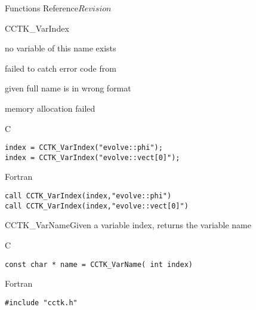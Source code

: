 \begin{cactuspart}{ Functions Reference}{}{$Revision$}
\begin{FunctionDescription}{CCTK\_VarIndex}{}
\begin{ErrorSection}
\begin{Error}{-1}
no variable of this name exists
\end{Error}
\begin{Error}{-2}
failed to catch error code from 
\end{Error}
\begin{Error}{-3}
given full name is in wrong format
\end{Error}
\begin{Error}{-4}
memory allocation failed
\end{Error}
\end{ErrorSection}
\begin{ExampleSection}
\begin{Example}{C}
\begin{verbatim}
index = CCTK_VarIndex("evolve::phi");
index = CCTK_VarIndex("evolve::vect[0]");
\end{verbatim}
\end{Example}
\begin{Example}{Fortran}
\begin{verbatim}
call CCTK_VarIndex(index,"evolve::phi")
call CCTK_VarIndex(index,"evolve::vect[0]")
\end{verbatim}
\end{Example}
\end{ExampleSection}
\end{FunctionDescription}


\begin{FunctionDescription}{CCTK\_VarName}{Given a variable index, returns the variable name}
\label{CCTK-VarName}
\begin{SynopsisSection}
\begin{Synopsis}{C}
\begin{verbatim}const char * name = CCTK_VarName( int index)\end{verbatim}
\end{Synopsis}
\begin{Synopsis}{Fortran}
\begin{verbatim}
#include "cctk.h"


\end{verbatim}
\end{Synopsis}
\end{SynopsisSection}
\end{FunctionDescription}
\end{cactuspart}
